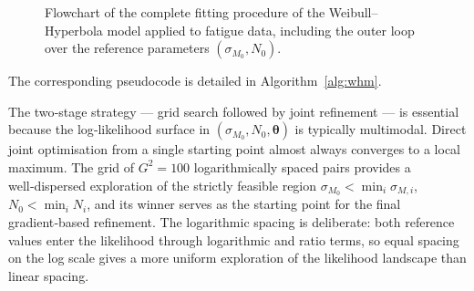 \begin{figure}[htbp]
\begin{tikzpicture}
\end{tikzpicture}
\caption{Flowchart of the complete fitting procedure of the Weibull–Hyperbola model applied to fatigue data, including the outer loop over the reference parameters \((\sigma_{M_0}, N_0)\).}
\label{fig:flowchart}
\end{figure}

The corresponding pseudocode is detailed in Algorithm~\ref{alg:whm}.

\begin{remarkbox}
\begin{remarkT}
The two‑stage strategy — grid search followed by joint refinement — is essential because the log‑likelihood surface in \((\sigma_{M_0},N_0,\boldsymbol{\theta})\) is typically multimodal. Direct joint optimisation from a single starting point almost always converges to a local maximum. The grid of \(G^2=100\) logarithmically spaced pairs provides a well‑dispersed exploration of the strictly feasible region \(\sigma_{M_0}<\min_i\sigma_{M,i}\), \(N_0<\min_i N_i\), and its winner serves as the starting point for the final gradient‑based refinement. The logarithmic spacing is deliberate: both reference values enter the likelihood through logarithmic and ratio terms, so equal spacing on the log scale gives a more uniform exploration of the likelihood landscape than linear spacing.
\end{remarkT}
\end{remarkbox}

